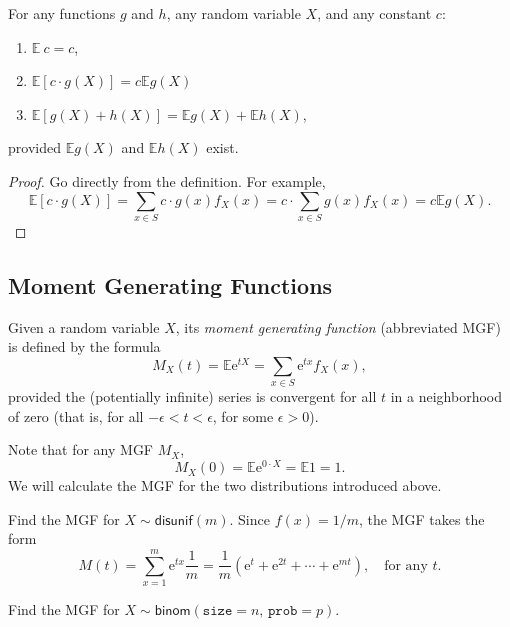 \documentclass[captions=tableheading]{scrbook}
\begin{document}
\begin{prop}
For any functions \(g\) and \(h\), any random variable \(X\), and any constant \(c\): 
\begin{enumerate}
\item \(\mathbb{E}\: c=c\),
\item \(\mathbb{E}[c\cdot g(X)]=c\mathbb{E} g(X)\)
\item \(\mathbb{E}[g(X)+h(X)]=\mathbb{E} g(X)+\mathbb{E} h(X)\),
\end{enumerate}
provided \(\mathbb{E} g(X)\) and \(\mathbb{E} h(X)\) exist.
\end{prop}

\begin{proof}
Go directly from the definition. For example,
\[
\mathbb{E}[c\cdot g(X)]=\sum_{x\in S}c\cdot g(x)f_{X}(x)=c\cdot\sum_{x\in S}g(x)f_{X}(x)=c\mathbb{E} g(X).
\]
\end{proof}
\subsection{Moment Generating Functions}
\label{sec-5-4-2}
\label{sub-MGFs}


\begin{defn}
Given a random variable \(X\), its \emph{moment generating function} (abbreviated MGF) is defined by the formula
\begin{equation}
M_{X}(t)=\mathbb{E}\mathrm{e}^{tX}=\sum_{x\in S}\mathrm{e}^{tx}f_{X}(x),
\end{equation}
provided the (potentially infinite) series is convergent for all \(t\) in a neighborhood of zero (that is, for all \(-\epsilon<t<\epsilon\), for some \(\epsilon>0\)).
\end{defn}

Note that for any MGF \(M_{X}\),
\begin{equation}
M_{X}(0)=\mathbb{E}\mathrm{e}^{0\cdot X}=\mathbb{E}1=1.
\end{equation}
We will calculate the MGF for the two distributions introduced above.

\begin{example}
Find the MGF for \(X\sim\mathsf{disunif}(m)\). 
Since \(f(x)=1/m\), the MGF takes the form
\[
M(t)=\sum_{x=1}^{m}\mathrm{e}^{tx}\frac{1}{m}=\frac{1}{m}(\mathrm{e}^{t}+\mathrm{e}^{2t}+\cdots+\mathrm{e}^{mt}),\quad\mbox{for any $t$.}
\]

\end{example}

\begin{example}
Find the MGF for \(X\sim\mathsf{binom}(\mathtt{size}=n,\,\mathtt{prob}=p)\).
\end{example}
\end{document}
